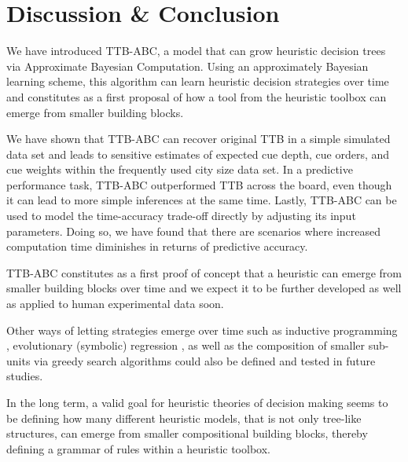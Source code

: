\documentclass[a4paper,man, natbib]{apa6}
\begin{document}

\section{Discussion \& Conclusion}
We have introduced TTB-ABC, a model that can grow heuristic decision trees via Approximate Bayesian Computation. Using an approximately Bayesian learning scheme, this algorithm can learn heuristic decision strategies over time and constitutes as a first proposal of how a tool from the heuristic toolbox can emerge from smaller building blocks.

We have shown that TTB-ABC can recover original TTB in a simple simulated data set and leads to sensitive estimates of expected cue depth, cue orders, and cue weights within the frequently used city size data set. In a predictive performance task, TTB-ABC outperformed TTB across the board, even though it can lead to more simple inferences at the same time. Lastly, TTB-ABC can be used to model the time-accuracy trade-off directly by adjusting its input parameters. Doing so, we have found that there are scenarios where increased computation time diminishes in returns of predictive accuracy.

TTB-ABC constitutes as a first proof of concept that a heuristic can emerge from smaller building blocks over time and we expect it to be further developed as well as applied to human experimental data soon. 

Other ways of letting strategies emerge over time such as inductive programming \citep{muggleton1994bayesian}, evolutionary (symbolic) regression \citep{dechter2013bootstrap}, as well as the composition of smaller sub-units via greedy search algorithms \citep{duvenaud2013structure} could also be defined and tested in future studies.

In the long term, a valid goal for heuristic theories of decision making seems to be defining how many different heuristic models, that is not only tree-like structures, can emerge from smaller compositional building blocks, thereby defining a grammar of rules within a heuristic toolbox.



\end{document}
